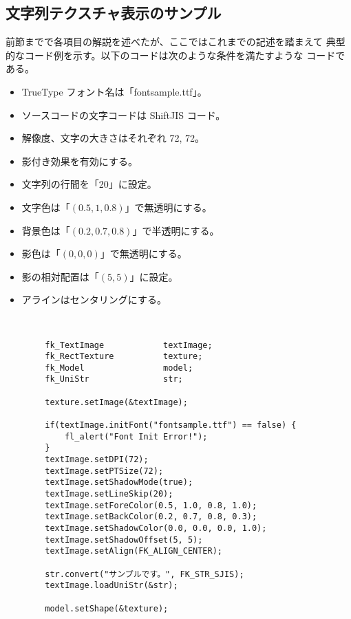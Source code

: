 \subsection{文字列テクスチャ表示のサンプル}
前節までで各項目の解説を述べたが、ここではこれまでの記述を踏まえて
典型的なコード例を示す。以下のコードは次のような条件を満たすような
コードである。
\begin{itemize}
 \item TrueType フォント名は「fontsample.ttf」。
 \item ソースコードの文字コードは ShiftJIS コード。
 \item 解像度、文字の大きさはそれぞれ 72, 72。
 \item 影付き効果を有効にする。
 \item 文字列の行間を「20」に設定。
 \item 文字色は「\((0.5, 1, 0.8)\)」で無透明にする。
 \item 背景色は「\((0.2, 0.7, 0.8)\)」で半透明にする。
 \item 影色は「\((0, 0, 0)\)」で無透明にする。
 \item 影の相対配置は「\((5, 5)\)」に設定。
 \item アラインはセンタリングにする。
\end{itemize}
~ \\
\begin{breakbox}
\begin{verbatim}
        fk_TextImage            textImage;
        fk_RectTexture          texture;
        fk_Model                model;
        fk_UniStr               str;

        texture.setImage(&textImage);

        if(textImage.initFont("fontsample.ttf") == false) {
            fl_alert("Font Init Error!");
        }
        textImage.setDPI(72);
        textImage.setPTSize(72);
        textImage.setShadowMode(true);
        textImage.setLineSkip(20);
        textImage.setForeColor(0.5, 1.0, 0.8, 1.0);
        textImage.setBackColor(0.2, 0.7, 0.8, 0.3);
        textImage.setShadowColor(0.0, 0.0, 0.0, 1.0);
        textImage.setShadowOffset(5, 5);
        textImage.setAlign(FK_ALIGN_CENTER);

        str.convert("サンプルです。", FK_STR_SJIS);
        textImage.loadUniStr(&str);

        model.setShape(&texture);
\end{verbatim}
\end{breakbox}

